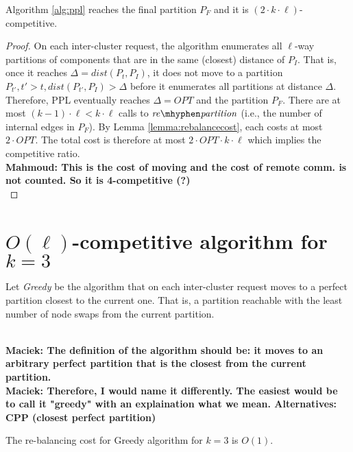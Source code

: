 \documentclass[manuscript,screen=true]{acmart}
\newcommand{\OPT}{\mathit{OPT}}
\newcommand\mahmoud[1]{\color{green}\textbf{\\ Mahmoud: #1}\\\color{black}}
\newcommand\maciek[1]{\color{brown}\textbf{\\ Maciek: #1}\color{black}}
\begin{document}
\begin{theorem}	\label{thm:upperbound}
    Algorithm \ref{alg:ppl} reaches the final partition $P_F$ and it is $(2\cdot k\cdot\ell)$-competitive.
\end{theorem}
\begin{proof}
      On each inter-cluster request,
     the algorithm enumerates all $\ell$-way partitions of components
     that are in the same (closest) distance of $P_I$.
     That is, 
     once it reaches $\Delta = \mathit{dist} (P_{t}, P_I)$,
     it does not move to a partition
     $P_{t'}, t'>t,\mathit{dist} (P_{t'}, P_I) > \Delta$
     before it enumerates all partitions at distance $\Delta$.
     Therefore,
     PPL eventually reaches $\Delta=\OPT$ and the partition $P_F$.
    There are at most $(k-1)\cdot\ell < k\cdot\ell $ calls   to $\mathit{re\mhyphen partition}$
     (i.e., the number of internal edges in $P_F$).
    By Lemma \ref{lemma:rebalancecost},
    each costs at most $2\cdot\OPT$.
    The total cost is therefore at most $2\cdot\OPT\cdot k\cdot\ell$ which implies the competitive ratio.
    \mahmoud{This is the cost of moving and the cost of remote comm. is not counted.
    	So it is 4-competitive (?)}
 \end{proof}

\section{$O(\ell)$-competitive algorithm for $k=3$}

Let \emph{Greedy} be the algorithm that on each inter-cluster request
 moves to a perfect partition closest to the current one.
 That is,
 a partition reachable with the least number of node swaps from the current partition.

\maciek{The definition of the algorithm should be: it moves to an arbitrary perfect partition that is the closest from the current partition.}
\maciek{Therefore, I would name it differently. The easiest would be to call it "greedy" with an explaination what we mean. Alternatives: CPP (closest perfect partition)}

\begin{lemma} \label{lemma:k=3}
  The re-balancing cost for  Greedy algorithm for $k=3$ is $O(1)$.
  \label{rebalancing-cost}
\end{lemma}
\end{document}
